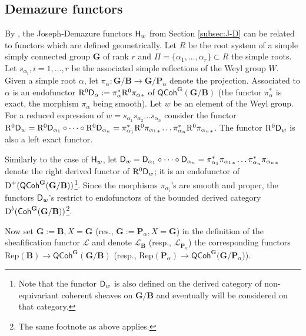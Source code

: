 \documentclass[sn-mathphys-num]{sn-jnl}%
\newcommand{\Ll}{\mathcal L}
\newcommand{\Rep}{{\mathrm{Rep}}}
\newcommand*{\Dd}{\mathop{\mathrm D\kern0pt}\nolimits}
\newcommand{\QCoh}{\mathsf{QCoh}}
\newcommand{\sH}{{\sf H}}
\newcommand{\bg}{\mathbf G}
\newcommand{\fb}{\mathbf B}
\newcommand{\bp}{\mathbf P}
\theoremstyle{definition}
\begin{document}
\subsection{Demazure functors}\label{subsec:Demfun}

By \cite[Section 5.17-5.18]{Jan}, the Joseph-Demazure functors ${\sH}_w$ from Section \ref{subsec:J-D} can be related to functors which are defined  geometrically. Let $R$ be the root system of a simple simply connected group $ \bg$ of rank $r$ and $\Pi=\{\alpha _1,\dots ,\alpha _r\}\subset R$ the simple roots. 
Let $s_{\alpha _i}, i=1,\dots,r$ be the associated simple reflections of the Weyl group $W$. Given a simple root $\alpha$, let $\pi _{\alpha}: { \bg}/{\fb}\rightarrow { \bg}/{\bp}_{\alpha}$ denote the projection. Associated to $\alpha$ is an endofunctor ${\rm R}^0{\sf D}_{\alpha}:=\pi _{\alpha}^{\ast}{\rm R}^0{\pi _{\alpha}}_{\ast}$ of ${\QCoh}^{ \bg}({ \bg}/{\fb})$ (the functor $\pi _{\alpha}^{\ast}$ is exact, the morphism 
$\pi _{\alpha}$ being smooth). Let $w$ be an element of the Weyl group. For a reduced expression of $w = s_{\alpha _1}s_{\alpha _2}\dots s_{\alpha _n}$ consider the functor ${\rm R}^0{\sf D}_w ={\rm R}^0{\sf D}_{\alpha _1}\circ \dots \circ {\rm R}^0{\sf D}_{\alpha _n} = \pi _{\alpha _1}^{\ast}{\rm R}^0{\pi _{\alpha _1}}_{\ast}\dots \pi _{\alpha _n}^{\ast}{\rm R}^0{\pi _{\alpha _n}}_{\ast}$. The functor ${\rm R}^0{\sf D}_w $ is also a left exact functor.

Similarly to the case of ${\sH}_w$, let ${\sf D}_w={\sf D}_{\alpha _1}\circ \dots \circ {\sf D}_{\alpha _n} = \pi _{\alpha _1}^{\ast}{\pi _{\alpha _1}}_{\ast}\dots \pi _{\alpha _n}^{\ast}{\pi _{\alpha _n}}_{\ast}$ denote the right derived functor of ${\rm R}^0{\sf D}_w$; it is an endofunctor of $\Dd ^{+}({\QCoh}^{ \bg}({ \bg}/{\fb}))$\footnote{Note that the functor ${\sf D}_{w}$ is also defined on the derived category of non-equivariant coherent sheaves on $ \bg/\fb$ and eventually will be considered on that category.}. Since the morphisms $\pi _{\alpha _i}$'s are smooth and proper, the functors ${\sf D}_w$'s restrict to endofunctors of the bounded derived category $\Dd ^b({\sf Coh}^{ \bg}({ \bg}/{\fb}))$\footnote{The same footnote as above applies.}.

Now set ${ \bg}:={\fb}, X={ \bg}$ (res.,  ${ \bg}:={\bp}_{\alpha}, X={ \bg}$) in the definition of the sheafification functor $\Ll$ and denote $\Ll _{\fb}$ (resp., $\Ll _{{\bp}_{\alpha}}$) the corresponding functors ${\Rep}({\fb})\rightarrow {\QCoh}^{ \bg}({ \bg}/{\fb})$ (resp., ${\Rep}({\bp}_{\alpha})\rightarrow {\QCoh}^{ \bg}({ \bg}/{\bp}_{\alpha}$)).
\end{document}
